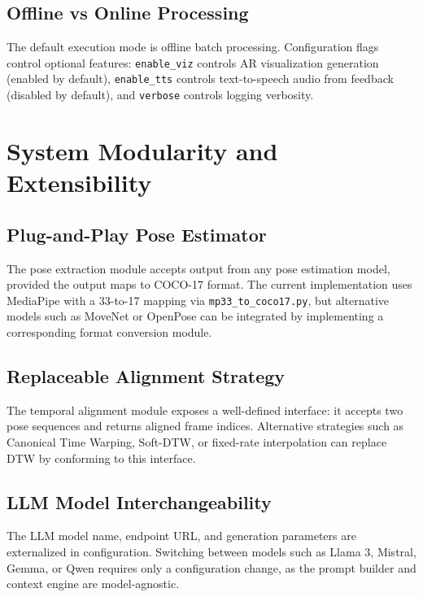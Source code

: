 \subsection{Offline vs Online Processing}

The default execution mode is offline batch processing. Configuration flags control optional features: \texttt{enable\_viz} controls AR visualization generation (enabled by default), \texttt{enable\_tts} controls text-to-speech audio from feedback (disabled by default), and \texttt{verbose} controls logging verbosity.


\section{System Modularity and Extensibility}

\subsection{Plug-and-Play Pose Estimator}

The pose extraction module accepts output from any pose estimation model, provided the output maps to COCO-17 format. The current implementation uses MediaPipe with a 33-to-17 mapping via \texttt{mp33\_to\_coco17.py}, but alternative models such as MoveNet or OpenPose can be integrated by implementing a corresponding format conversion module.

\subsection{Replaceable Alignment Strategy}

The temporal alignment module exposes a well-defined interface: it accepts two pose sequences and returns aligned frame indices. Alternative strategies such as Canonical Time Warping, Soft-DTW, or fixed-rate interpolation can replace DTW by conforming to this interface.

\subsection{LLM Model Interchangeability}

The LLM model name, endpoint URL, and generation parameters are externalized in configuration. Switching between models such as Llama 3, Mistral, Gemma, or Qwen requires only a configuration change, as the prompt builder and context engine are model-agnostic.


